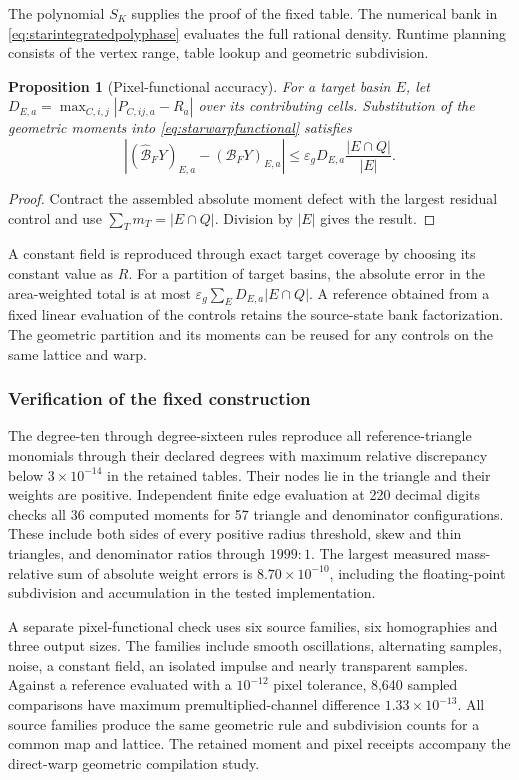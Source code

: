 \documentclass[journal]{IEEEtran}
\newtheorem{proposition}{Proposition}
\begin{document}
The polynomial $S_K$ supplies the proof of the fixed table. The numerical
bank in \eqref{eq:starintegratedpolyphase} evaluates the full rational
density. Runtime planning consists of the vertex range, table lookup and
geometric subdivision.

\begin{proposition}[Pixel-functional accuracy]
For a target basin $E$, let
$D_{E,a}=\max_{C,i,j}|P_{C,ij,a}-R_a|$ over its contributing cells.
Substitution of the geometric moments into \eqref{eq:starwarpfunctional}
satisfies
\begin{equation}
 |(\widehat{\mathcal B}_FY)_{E,a}-(\mathcal B_FY)_{E,a}|
 \leq\varepsilon_gD_{E,a}\frac{|E\cap Q|}{|E|}.
 \label{eq:starwarperror}
\end{equation}
\end{proposition}
\begin{proof}
Contract the assembled absolute moment defect with the largest residual
control and use $\sum_Tm_T=|E\cap Q|$. Division by $|E|$ gives the result.
\end{proof}

A constant field is reproduced through exact target coverage by choosing
its constant value as $R$. For a partition of target basins, the absolute
error in the area-weighted total is at most
$\varepsilon_g\sum_E D_{E,a}|E\cap Q|$. A reference obtained from a fixed
linear evaluation of the controls retains the source-state bank
factorization. The geometric partition and its moments can be reused for
any controls on the same lattice and warp.

\subsubsection{Verification of the fixed construction}
The degree-ten through degree-sixteen rules reproduce all reference-triangle
monomials through their declared degrees with maximum relative discrepancy
below $3\times10^{-14}$ in the retained tables. Their nodes lie in the
triangle and their weights are positive. Independent finite edge evaluation
at 220 decimal digits checks all 36 computed moments for 57 triangle and
denominator configurations. These include both sides of every positive
radius threshold, skew and thin triangles, and denominator ratios through
$1999:1$. The largest measured mass-relative sum of absolute weight errors
is $8.70\times10^{-10}$, including the floating-point subdivision and
accumulation in the tested implementation.

A separate pixel-functional check uses six source families, six homographies
and three output sizes. The families include smooth oscillations, alternating
samples, noise, a constant field, an isolated impulse and nearly transparent
samples. Against a reference evaluated with a $10^{-12}$ pixel tolerance,
8,640 sampled comparisons have maximum premultiplied-channel difference
$1.33\times10^{-13}$. All source families produce the same geometric rule
and subdivision counts for a common map and lattice. The retained moment
and pixel receipts accompany the direct-warp geometric compilation study.
\end{document}
